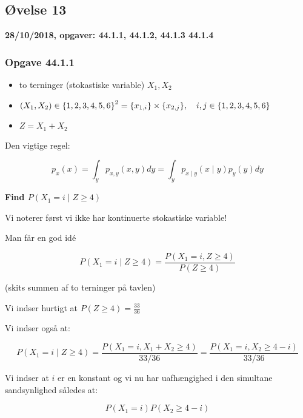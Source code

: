 \horizline

\subsection{Øvelse 13}

\textbf{28/10/2018, opgaver: 44.1.1, 44.1.2, 44.1.3 44.1.4}

\subsubsection{Opgave 44.1.1}

\begin{itemize}
    \item to terninger (stokastiske variable) $X_1, X_2$ 
    \item $(X_1, X_2) \in \left\{ 1, 2, 3, 4, 5, 6\right\}^2 = \{x_{1,i}\} \times \{x_{2,j}\}, \quad i,j \in \left\{ 1, 2, 3, 4, 5, 6\right\}$
    \item $Z = X_1 + X_2$
\end{itemize}

Den vigtige regel:

\begin{equation}
    p_x(x) =  \int_{y} p_{x, y}(x,y) dy= \int_{y} p_{x\mid y}(x \mid y)p_y(y) dy 
\end{equation}

\textbf{Find $P(X_1 = i \mid Z \geq 4)$}

Vi noterer først vi ikke har kontinuerte stokastiske variable!

Man får en god idé

\begin{equation}
    P(X_1 = i \mid Z \geq 4) = \frac{P(X_1 = i , Z \geq 4)}{P(Z\geq 4)}
\end{equation}

(skits summen af to terninger på tavlen) 

Vi indser hurtigt at $P(Z \geq 4) = \frac{33}{36}$

Vi indser også at:

\begin{equation}
    P(X_1 = i \mid Z \geq 4) = \frac{P(X_1 = i , X_1 + X_2 \geq 4)}{33/36}  = \frac{P(X_1 = i ,  X_2 \geq 4 - i)}{33/36}
\end{equation}

Vi indser at $i$ er en konstant og vi nu har uafhængighed i den simultane sandsynlighed således at:

\begin{equation}
    P(X_1 = i)P(X_2 \geq 4 -i )
\end{equation}

